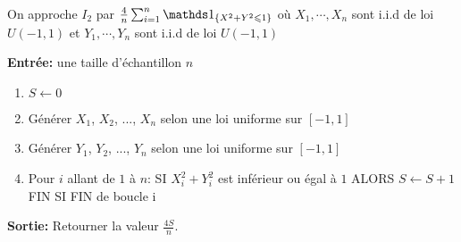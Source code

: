 \documentclass[11pt]{td_um}
\begin{document}
\begin{exo}{}
\begin{enumerate}
{                On approche $I_2$ par $\frac{4}{n} \sum_{i=1}^n \one_{ \{X^2+Y^2\leq 1\}}$ où  $X_1, \cdots, X_n$ sont i.i.d de loi $U(-1,1)$ et  $Y_1, \cdots, Y_n$ sont i.i.d de loi $U(-1,1)$

                \begin{algorithm}[H]
                    \SetAlgoLined
                    \textbf{Entrée:} une taille d'échantillon $n$

                    \begin{enumerate}
                        \item  $S\leftarrow 0$
                        \item  Générer $X_1$, $X_2$, ..., $X_n$ selon une loi uniforme sur $[-1,1]$
                        \item  Générer $Y_1$, $Y_2$, ..., $Y_n$ selon une loi uniforme sur $[-1,1]$
                        \item  Pour $i$ allant de $1$ à $n$:
                            SI $X_i^2+Y_i^2$ est inférieur ou égal à $1$ ALORS $S \leftarrow S+1$
                            FIN SI
                            FIN de boucle i
                    \end{enumerate}
                    \textbf{Sortie:} Retourner la valeur $\tfrac{4S}{n}$.
                \end{algorithm}
            }
    \end{enumerate}
\end{exo}
\end{document}
